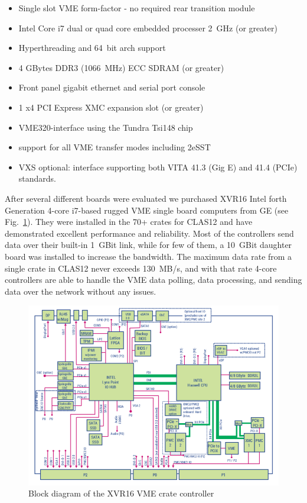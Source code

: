 \begin{itemize}
	\item Single slot VME form-factor - no required rear transition module
	\item Intel Core i7 dual or quad core embedded processer 2~GHz (or greater)
	\item Hyperthreading and 64~bit arch support
	\item 4 GBytes DDR3 (1066~MHz) ECC SDRAM (or greater)
	\item Front panel gigabit ethernet and serial port console
	\item 1 x4 PCI Express XMC expansion slot (or greater)
	\item VME320-interface using the Tundra Tsi148 chip
	\item support for all VME transfer modes including 2eSST
	\item VXS optional: interface supporting both VITA 41.3 (Gig E) and 41.4 (PCIe) standards.
\end{itemize}

After several different boards were evaluated we purchased XVR16 Intel forth Generation 4-core i7-based rugged VME single board computers from GE (see Fig.~\ref{fig:XVR16diagram}). They were installed in the 70+ crates for CLAS12 and have demonstrated excellent performance and reliability. Most of the controllers send data over their built-in 1~GBit link, while for few of them, a 10~GBit daughter board was installed to increase the bandwidth. The maximum data rate from a single crate in CLAS12 never exceeds 130~MB/s, and with that rate 4-core controllers are able to handle the VME data polling, data processing, and sending data over the network without any issues. 

\begin{figure}[hbt]
	\centering
	\includegraphics[width=1.0\columnwidth,keepaspectratio]{img/XVR16_diagram.png}
	\caption{Block diagram of the XVR16 VME crate controller}
	\label{fig:XVR16diagram}
\end{figure}




